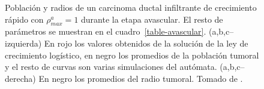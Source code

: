 \begin{figure}[p]
\begin{center}
    \end{center}\vspace*{-0.6cm}
    \caption[Poblaci\'on y radios de un carcinoma ductal infiltrante de crecimiento r\'apido con $\rho_{max}^a=1$ durante la etapa avascular]{Poblaci\'on y radios de un carcinoma ductal infiltrante de crecimiento r\'apido con $\rho_{max}^a=1$ durante la etapa avascular. El resto de par\'ametros se muestran en el cuadro~\ref{table-avascular}. (a,b,c--izquierda) En rojo los valores obtenidos de la soluci\'on de la ley de crecimiento log\'istico, en negro los promedios de la poblaci\'on tumoral y el resto de curvas son varias simulaciones del aut\'omata. (a,b,c--derecha) En negro los promedios del radio tumoral. Tomado de \cite{viabarre2019}.}
    \label{graph-avascular-simulations}
    \end{figure}


